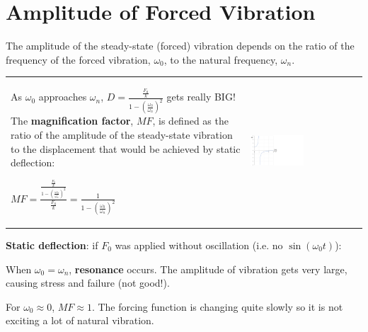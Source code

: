 \documentclass[12pt,letterpaper,twoside]{report}
\begin{document}
\section{Amplitude of Forced Vibration}
The amplitude of the steady-state (forced) vibration depends on the ratio of the frequency of the forced vibration, $\omega_0$, to the natural frequency, $\omega_n$. 

\begin{center}
\begin{tabu} to 1\textwidth {   X[1, l, m]  X[1, C, m]  }
As $\omega_0$ approaches $\omega_n$, $\displaystyle D = \frac{\displaystyle \frac{F_0}{k}}{1- \left( \displaystyle \frac{\omega_0}{\omega_n} \right)^2}$ gets really BIG! \newline \newline The \textbf{magnification factor}, $MF$, is defined as the ratio of the amplitude of the steady-state vibration to the displacement that would be achieved by static deflection:  \newline \newline \begin{center} $MF = \displaystyle \frac{ \frac{\displaystyle \frac{F_0}{k}}{1- \left( \displaystyle \frac{\omega_0}{\omega_n} \right)^2}}{\displaystyle \frac{F_0}{k}} = \frac{1}{1- \left( \displaystyle \frac{\omega_0}{\omega_n} \right)^2}$ \end{center} & \includegraphics[trim={0cm 0cm 16cm 0cm},clip,width=0.5\textwidth, center]{Slide87} \\
\end{tabu}
\end{center}

\textbf{Static deflection}: if $F_0$ was applied without oscillation (i.e. no $\sin(\omega_0 t)$):

\vspace*{8\baselineskip}

When $\omega_0 = \omega_n$, \textbf{resonance} occurs.  The amplitude of vibration gets very large, causing stress and failure (not good!).

For $\omega_0 \approx 0$, $MF \approx 1$. The forcing function is changing quite slowly so it is not exciting a lot of natural vibration.  
\end{document}
